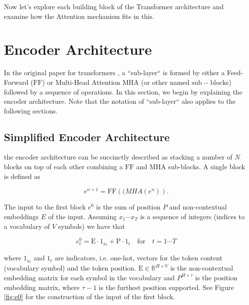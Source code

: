 Now let's explore each building block of the Transformer architecture and examine how the Attention mechanism fits in this.



\section{Encoder Architecture}\label{sec:enc}

In the original paper for transformers \citep{vaswani2017attention}, a ``sub-layer`` is formed by either a Feed-Forward ($\mathrm{FF}$) or Multi-Head Attention $\mathrm{MHA}$ (or other named $\mathrm{sub-block}$s) followed by a sequence of operations. In this section, we begin by explaining the encoder architecture. Note that the notation of ``sub-layer`` also applies to the following sections.

\subsection{Simplified Encoder Architecture}

the encoder architecture can be succinctly described as stacking a number of $N$ blocks on top of each other combining a $\mathrm{FF}$ and $\mathrm{MHA}$ sub-blocks. A single block is defined as

\begin{equation}
e^{n+1} = \mathrm{FF}(\mathrm(MHA(e^n)).
\end{equation}

The input to the first block $e^0$ is the sum of position $P$ and non-contextual embeddings $E$ of the input. Assuming $x_1 \cdots x_T$ is a sequence of integers (indices to a vocabulary of $V$ symbols) we have that

\begin{equation}
e^{0}_t = \mathrm{E} \cdot \mathrm{1}_{x_t} + \mathrm{P} \cdot \mathrm{1}_t \quad \mbox{for} \quad t=1 \cdots T
\end{equation}

where $\mathrm{1}_{x_t}$ and $\mathrm{1}_t$ are indicators, i.e. one-hot, vectors for the token content (vocabulary symbol) and the token position. $\mathrm{E} \in \mathbb{R}^{H \times V}$ is the non-contextual embedding matrix for each symbol in the vocabulary and $P^{H \times \tau}$ is the position embedding matrix, where  $\tau-1$ is the furthest position supported. See Figure \ref{fig:e0} for the construction of the input of the first block. \\



